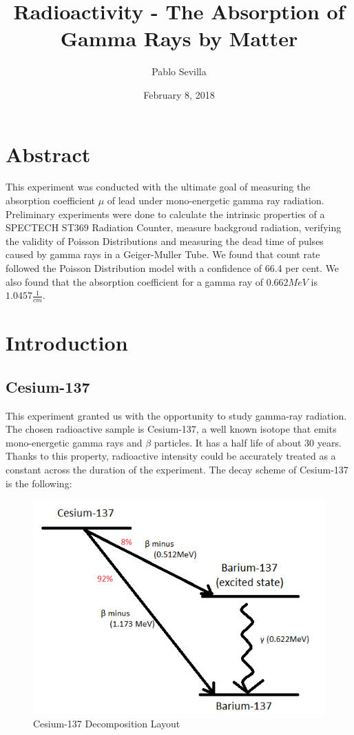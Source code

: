 \documentclass[a4paper]{article}
\title{Radioactivity - The Absorption of Gamma Rays by Matter}
\date{February 8, 2018}
\author{Pablo Sevilla}
\begin{document}
  \maketitle
  \newpage
  
  \section*{Abstract}
  This experiment was conducted with the ultimate goal of measuring the absorption coefficient $\mu$ of lead under mono-energetic gamma ray radiation. Preliminary experiments were done to calculate the intrinsic properties of a SPECTECH ST369 Radiation Counter, measure backgroud radiation, verifying the validity of Poisson Distributions and measuring the dead time of pulses caused by gamma rays in a Geiger-Muller Tube. We found that count rate followed the Poisson Distribution model with a confidence of 66.4 per cent. We also found that the absorption coefficient for a gamma ray of $0.662MeV$ is $1.0457\frac{1}{cm}$.
  
  \section{Introduction}
  \subsection{Cesium-137}
  This experiment granted us with the opportunity to study gamma-ray radiation. The chosen radioactive sample is Cesium-137, a well known isotope that emits mono-energetic gamma rays and $\beta$ particles. It has a half life of about 30 years. Thanks to this property, radioactive intensity could be accurately treated as a constant across the duration of the experiment. The decay scheme of Cesium-137 is the following:
  
  \begin{figure}[h]
  \includegraphics[scale=0.75]{Cs-137.png} 
  \centering
  \caption{Cesium-137 Decomposition Layout}
  \end{figure}
  
\end{document}
